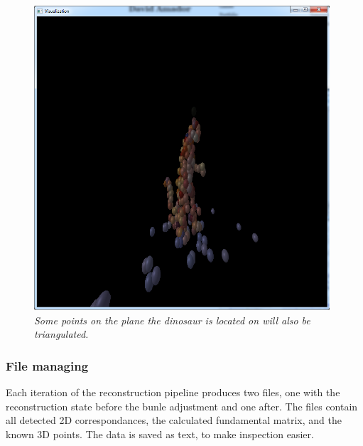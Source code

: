 \begin{figure}[htb]
	\centering
	\includegraphics[width=110mm]{images/inAplane.png}
	\caption{\textit{Some points on the plane the dinosaur is located on will also be triangulated.}}
	\label{fig:pointsOnAPlane}  %
\end{figure}

\subsubsection{File managing}
Each iteration of the reconstruction pipeline produces two files, one with the reconstruction state before the bunle adjustment and one after. The files contain all detected 2D correspondances, the calculated fundamental matrix, and the known 3D points. The data is saved as text, to make inspection easier.